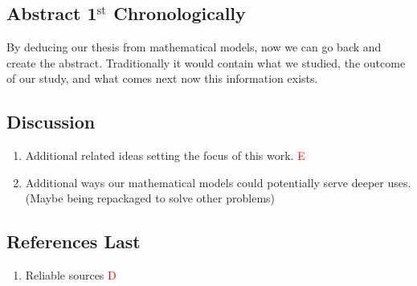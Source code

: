 \subsection{Abstract \textcolor{BurntOrange}{1$^{\text{st}}$ Chronologically}}
By deducing our thesis from mathematical models, now we can go back and create the abstract. Traditionally it would contain what we studied, the outcome of our study, and what comes next now this information exists.
\subsection{Discussion}
\begin{enumerate}
	\item Additional related ideas setting the focus of this work.  \hfill\textcolor{red}{E}
	\item Additional ways our mathematical models could potentially serve deeper uses. (Maybe being repackaged to solve other problems)
\end{enumerate}

\subsection{References \textcolor{BurntOrange}{Last}}
\begin{enumerate}
	\item Reliable sources \hfill\textcolor{red}{D} 
\end{enumerate}
